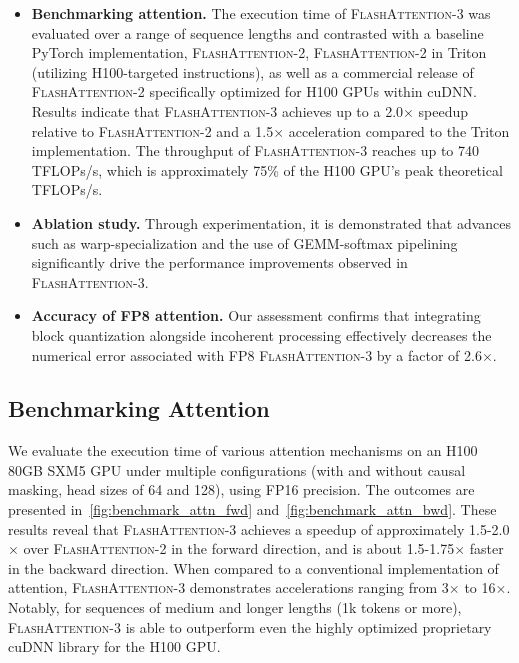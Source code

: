 \begin{enumerate}
\begin{itemize}

\item \textbf{Benchmarking attention.} The execution time of \textsc{FlashAttention-3} was evaluated over a range of sequence lengths and contrasted with a baseline PyTorch implementation, \textsc{FlashAttention-2}, \textsc{FlashAttention-2} in Triton (utilizing H100-targeted instructions), as well as a commercial release of \textsc{FlashAttention-2} specifically optimized for H100 GPUs within cuDNN. Results indicate that \textsc{FlashAttention-3} achieves up to a 2.0$\times$ speedup relative to \textsc{FlashAttention-2} and a 1.5$\times$ acceleration compared to the Triton implementation. The throughput of \textsc{FlashAttention-3} reaches up to 740 TFLOPs/s, which is approximately 75\% of the H100 GPU's peak theoretical TFLOPs/s. 

\item \textbf{Ablation study.} Through experimentation, it is demonstrated that advances such as warp-specialization and the use of GEMM-softmax pipelining significantly drive the performance improvements observed in \textsc{FlashAttention-3}.

\item \textbf{Accuracy of FP8 attention.} Our assessment confirms that integrating block quantization alongside incoherent processing effectively decreases the numerical error associated with FP8 \textsc{FlashAttention-3} by a factor of 2.6$\times$.
\end{itemize}

\subsection{Benchmarking Attention}
\label{subsec:benchmark_attn}

We evaluate the execution time of various attention mechanisms on an H100 80GB SXM5 GPU under multiple configurations (with and without causal masking, head sizes of 64 and 128), using FP16 precision. The outcomes are presented in~\cref{fig:benchmark_attn_fwd} and~\cref{fig:benchmark_attn_bwd}. These results reveal that \textsc{FlashAttention-3} achieves a speedup of approximately 1.5-2.0$\times$ over \textsc{FlashAttention-2} in the forward direction, and is about 1.5-1.75$\times$ faster in the backward direction. When compared to a conventional implementation of attention, \textsc{FlashAttention-3} demonstrates accelerations ranging from 3$\times$ to 16$\times$. Notably, for sequences of medium and longer lengths (1k tokens or more), \textsc{FlashAttention-3} is able to outperform even the highly optimized proprietary cuDNN library for the H100 GPU.


\end{enumerate}

